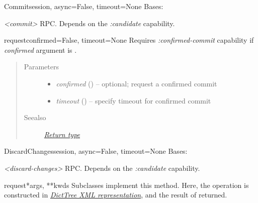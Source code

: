 \documentclass[a4paper,10pt,english]{manual}
\begin{document}
\hypertarget{ncclient.operations.Commit}{}\begin{classdesc}{Commit}{session, async=False, timeout=None}
Bases: \hyperlink{ncclient.operations.rpc.RPC}{}

\emph{\textless{}commit\textgreater{}} RPC. Depends on the \emph{:candidate} capability.

\hypertarget{ncclient.operations.Commit.request}{}\begin{methoddesc}{request}{confirmed=False, timeout=None}
Requires \emph{:confirmed-commit} capability if \emph{confirmed} argument is
\href{http://docs.python.org/library/constants.html\#True}{}.
\begin{quote}\begin{description}
\item[Parameters]\begin{itemize}
\item {} 
\emph{confirmed} (\href{http://docs.python.org/library/functions.html\#bool}{}) -- optional; request a confirmed commit

\item {} 
\emph{timeout} (\href{http://docs.python.org/library/functions.html\#int}{}) -- specify timeout for confirmed commit

\end{itemize}

\item[Seealso]
\hyperlink{return}{\emph{Return type}}

\end{description}\end{quote}
\end{methoddesc}
\end{classdesc}

\hypertarget{ncclient.operations.DiscardChanges}{}\begin{classdesc}{DiscardChanges}{session, async=False, timeout=None}
Bases: \hyperlink{ncclient.operations.rpc.RPC}{}

\emph{\textless{}discard-changes\textgreater{}} RPC. Depends on the \emph{:candidate} capability.

\hypertarget{ncclient.operations.DiscardChanges.request}{}\begin{methoddesc}{request}{*args, **kwds}
Subclasses implement this method. Here, the operation is constructed
in \hyperlink{dtree}{\emph{DictTree XML representation}}, and the result of  returned.
\end{methoddesc}
\end{classdesc}
\end{document}
